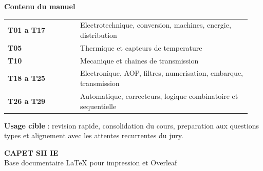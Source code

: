 \documentclass[11pt,a4paper]{article}
\begin{document}
\begin{titlepage}
\hspace*{4.9cm}
\begin{minipage}{0.68\textwidth}
\begin{tcolorbox}[
	enhanced,
	colback=white,
	colframe=colElec,
	boxrule=0.8pt,
	arc=2mm,
	left=8pt, right=8pt, top=8pt, bottom=8pt
]
\textbf{Contenu du manuel}\\[4pt]
\begin{tabular}{p{0.28\linewidth}p{0.66\linewidth}}
\textcolor{colElec}{\textbf{T01 a T17}} & Electrotechnique, conversion, machines, energie, distribution \\
\textcolor{colTherm}{\textbf{T05}} & Thermique et capteurs de temperature \\
\textcolor{colMeca}{\textbf{T10}} & Mecanique et chaines de transmission \\
\textcolor{colElec}{\textbf{T18 a T25}} & Electronique, AOP, filtres, numerisation, embarque, transmission \\
\textcolor{colAuto}{\textbf{T26 a T29}} & Automatique, correcteurs, logique combinatoire et sequentielle
\end{tabular}
\end{tcolorbox}
\end{minipage}

\vfill

\hspace*{4.9cm}
\begin{minipage}{0.68\textwidth}
\begin{tcolorbox}[
	enhanced,
	colback=colElec!6!white,
	colframe=colElec!45,
	boxrule=0.5pt,
	arc=2mm,
	left=8pt, right=8pt, top=6pt, bottom=6pt
]
\textbf{Usage cible} : revision rapide, consolidation du cours, preparation aux questions types et alignement avec les attentes recurrentes du jury.
\end{tcolorbox}

\vspace{0.5cm}
{\large\bfseries CAPET SII IE}\\[2pt]
{\normalsize Base documentaire LaTeX pour impression et Overleaf}
\end{minipage}
\end{titlepage}

\clearpage
{}
\setcounter{page}{1}































\end{document}
